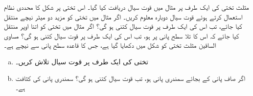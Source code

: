 مثلث تختی کی ایک طرف پر مثال  میں قوت سیال دریافت کیا گیا۔ اس تختی پر شکل  کا  محددی نظام استعمال کرتے ہوئے قوت سیال دوبارہ معلوم کریں۔ 
اگر مثال  میں تختی کو مزید دو میٹر نیچے منتقل کیا جائے، تب اس کی ایک طرف پر قوت سیال کتنی  ہو گی؟
اگر مثال  میں تختی کو اتنا اوپر منتقل کیا جائے کہ اس کا تلا سطح پانی پر ہو،  تب اس کی ایک طرف پر قوت سیال کتنی  ہو گی؟
مساوی الساقین مثلث تختی کو شکل  میں دکھایا گیا ہے، جس کا قاعدہ  سطح پانی سے  نیچے ہے۔
\begin{enumerate}[a.]
\item
تختی کی ایک طرف پر قوت سیال تلاش کریں۔
\item
اگر صاف پانی کے بجائے سمندری پانی ہو، تب قوت سیال کتنی ہو گی؟ سمندری پانی کی کثافت  ہے۔ 
\end{enumerate}

